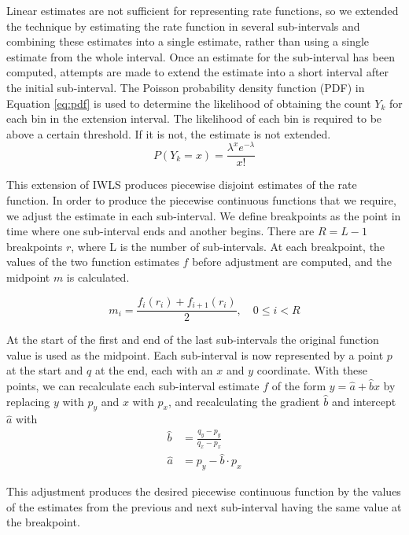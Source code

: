 \documentclass[a4paper,11pt]{article}
\begin{document}
   Linear estimates are not sufficient for representing rate functions, so we
   extended the technique by estimating the rate function in several
   sub-intervals and combining these estimates into a single estimate, rather
   than using a single estimate from the whole interval. Once an estimate for
   the sub-interval has been computed, attempts are made to extend the estimate
   into a short interval after the initial sub-interval. The Poisson probability
   density function (PDF) in Equation \ref{eq:pdf} is used to determine the
   likelihood of obtaining the count $Y_k$ for each bin in the extension
   interval. The likelihood of each bin is required to be above a certain
   threshold. If it is not, the estimate is not extended.
    \begin{equation}
    \label{eq:pdf}
    P(Y_k=x)=\frac{\lambda^xe^{-\lambda}}{x!}
    \end{equation}
    
    This extension of IWLS produces piecewise disjoint estimates of the rate
    function. In order to produce the piecewise continuous functions that we
    require, we adjust the estimate in each sub-interval. We define breakpoints
    as the point in time where one sub-interval ends and another begins. There
    are $R=L-1$ breakpoints $r$, where L is the number of sub-intervals. At each
    breakpoint, the values of the two function estimates $f$ before adjustment
    are computed, and the midpoint $m$ is calculated.

    \begin{equation} 
    m_i = \frac{f_{i}(r_i) + f_{i+1}(r_i)}{2},\quad 0\leq i < R
    \end{equation}

    At the start of the first and end of the last sub-intervals the original
    function value is used as the midpoint. Each sub-interval is now represented
    by a point $p$ at the start and $q$ at the end, each with an $x$ and $y$
    coordinate. With these points, we can recalculate each sub-interval estimate
    $f$ of the form $y=\hat{a}+\hat{b}x$ by replacing $y$ with $p_y$ and $x$
    with $p_x$, and recalculating the gradient $\hat{b}$ and intercept $\hat{a}$
    with
    \begin{align} 
    \hat{b} &= \frac{q_y-p_y}{q_x-p_x}\\
    \hat{a} &= p_y - \hat{b}\cdot p_x 
    \end{align}

    This adjustment produces the desired piecewise continuous function by the
    values of the estimates from the previous and next sub-interval having the
    same value at the breakpoint.
\end{document}
